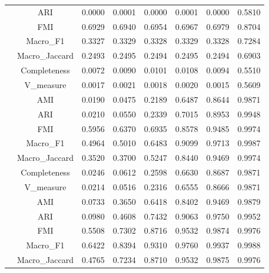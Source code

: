 \begin{table}[ht!]
\begin{tabular*}{\linewidth}{@{} lc c c c c c c @{}}
 & ARI  & 0.0000 & 0.0001 & 0.0000 & 0.0001 & 0.0000 & 0.5810 \\

 & FMI  & 0.6929 & 0.6940 & 0.6954 & 0.6967 & 0.6979 & 0.8704 \\

 & Macro_F1  & 0.3327 & 0.3329 & 0.3328 & 0.3329 & 0.3328 & 0.7284 \\

 & Macro_Jaccard  & 0.2493 & 0.2495 & 0.2494 & 0.2495 & 0.2494 & 0.6903 \\

 & Completeness  & 0.0072 & 0.0090 & 0.0101 & 0.0108 & 0.0094 & 0.5510 \\

 & V_measure  & 0.0017 & 0.0021 & 0.0018 & 0.0020 & 0.0015 & 0.5609 \\
\addlinespace
\multirow{7}{*}{DPC-FWSN}
 & AMI  & 0.0190 & 0.0475 & 0.2189 & 0.6487 & 0.8644 & 0.9871 \\

 & ARI  & 0.0210 & 0.0550 & 0.2339 & 0.7015 & 0.8953 & 0.9948 \\

 & FMI  & 0.5956 & 0.6370 & 0.6935 & 0.8578 & 0.9485 & 0.9974 \\

 & Macro_F1  & 0.4964 & 0.5010 & 0.6483 & 0.9099 & 0.9713 & 0.9987 \\

 & Macro_Jaccard  & 0.3520 & 0.3700 & 0.5247 & 0.8440 & 0.9469 & 0.9974 \\

 & Completeness  & 0.0246 & 0.0612 & 0.2598 & 0.6630 & 0.8687 & 0.9871 \\

 & V_measure  & 0.0214 & 0.0516 & 0.2316 & 0.6555 & 0.8666 & 0.9871 \\
\addlinespace
\multirow{7}{*}{GMM}
 & AMI  & 0.0733 & 0.3650 & 0.6418 & 0.8402 & 0.9469 & 0.9879 \\

 & ARI  & 0.0980 & 0.4608 & 0.7432 & 0.9063 & 0.9750 & 0.9952 \\

 & FMI  & 0.5508 & 0.7302 & 0.8716 & 0.9532 & 0.9874 & 0.9976 \\

 & Macro_F1  & 0.6422 & 0.8394 & 0.9310 & 0.9760 & 0.9937 & 0.9988 \\

 & Macro_Jaccard  & 0.4765 & 0.7234 & 0.8710 & 0.9532 & 0.9875 & 0.9976 \\


\end{tabular*}
\end{table}
